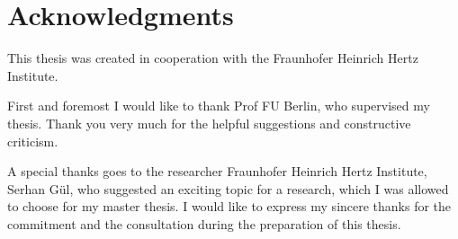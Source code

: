 \chapter*{Acknowledgments}
This thesis was created in cooperation with the Fraunhofer Heinrich Hertz Institute.

First and foremost I would like to thank Prof FU Berlin, who supervised my thesis. Thank you very much for the helpful suggestions and constructive criticism.

A special thanks goes to the researcher Fraunhofer Heinrich Hertz Institute, Serhan Gül, who suggested an exciting topic for a research, which I was allowed to choose for my master thesis. I would like to express my sincere thanks for the commitment and the consultation during the preparation of this thesis.

